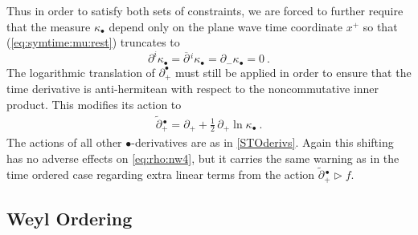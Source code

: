 \documentclass[11pt,a4paper]{article}
\def\d{\partial}
\def\od{\overline{\partial}}
\newcommand{\1}{\mathbb{1}}
\def\d{\partial}
\newcommand{\beq}{\begin{eqnarray}}
\newcommand{\eeq}{\end{eqnarray}}
\begin{document}
Thus in order to satisfy both sets of constraints, we are forced to
further require that the measure $\kappa_\bullet$ depend only on the
plane wave time coordinate $x^+$ so that (\ref{eq:symtime:mu:rest})
truncates to
\begin{equation}
  \label{eq:symtime:mu}
  \d^i\kappa_\bullet=\od{}^{\,i}\kappa_\bullet=\d_-\kappa_\bullet=0 \ .
\end{equation}
The logarithmic translation of $\d_+^\bullet$ must still be applied in
order to ensure that the time derivative is anti-hermitean with
respect to the noncommutative inner product. This modifies its action
to
\beq
  \label{eq:symtime:d}
  \widetilde\d{}^{\,\bullet}_+=\d_++\mbox{$\frac12$}\,\d_+\ln\kappa_\bullet
\ .
\eeq
 The actions of all other $\bullet$-derivatives are as in
 \eqref{STOderivs}. Again this shifting has no adverse effects on
 \eqref{eq:rho:nw4}, but it carries the same warning as in the time
 ordered case regarding extra linear terms from the action
 $\widetilde\d{}^{\,\bullet}_+\triangleright f$.

\subsection{Weyl Ordering\label{Weylint}}
\end{document}
